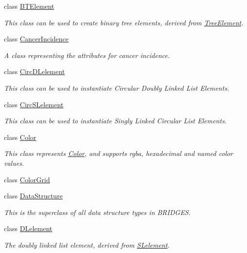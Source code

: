 \begin{DoxyCompactItemize}
class \mbox{\hyperlink{classbridges_1_1_b_t_element}{B\+T\+Element}}
\begin{DoxyCompactList}\small\item\em This class can be used to create binary tree elements, derived from \mbox{\hyperlink{classbridges_1_1_tree_element}{Tree\+Element}}. \end{DoxyCompactList}\item 
class \mbox{\hyperlink{classbridges_1_1_cancer_incidence}{Cancer\+Incidence}}
\begin{DoxyCompactList}\small\item\em A class representing the attributes for cancer incidence. \end{DoxyCompactList}\item 
class \mbox{\hyperlink{classbridges_1_1_circ_d_lelement}{Circ\+D\+Lelement}}
\begin{DoxyCompactList}\small\item\em This class can be used to instantiate Circular Doubly Linked List Elements. \end{DoxyCompactList}\item 
class \mbox{\hyperlink{classbridges_1_1_circ_s_lelement}{Circ\+S\+Lelement}}
\begin{DoxyCompactList}\small\item\em This class can be used to instantiate Singly Linked Circular List Elements. \end{DoxyCompactList}\item 
class \mbox{\hyperlink{classbridges_1_1_color}{Color}}
\begin{DoxyCompactList}\small\item\em This class represents \mbox{\hyperlink{classbridges_1_1_color}{Color}}, and supports rgba, hexadecimal and named color values. \end{DoxyCompactList}\item 
class \mbox{\hyperlink{classbridges_1_1_color_grid}{Color\+Grid}}
\item 
class \mbox{\hyperlink{classbridges_1_1_data_structure}{Data\+Structure}}
\begin{DoxyCompactList}\small\item\em This is the superclass of all data structure types in B\+R\+I\+D\+G\+ES. \end{DoxyCompactList}\item 
class \mbox{\hyperlink{classbridges_1_1_d_lelement}{D\+Lelement}}
\begin{DoxyCompactList}\small\item\em The doubly linked list element, derived from \mbox{\hyperlink{classbridges_1_1_s_lelement}{S\+Lelement}}. \end{DoxyCompactList}\item 

\end{DoxyCompactItemize}
